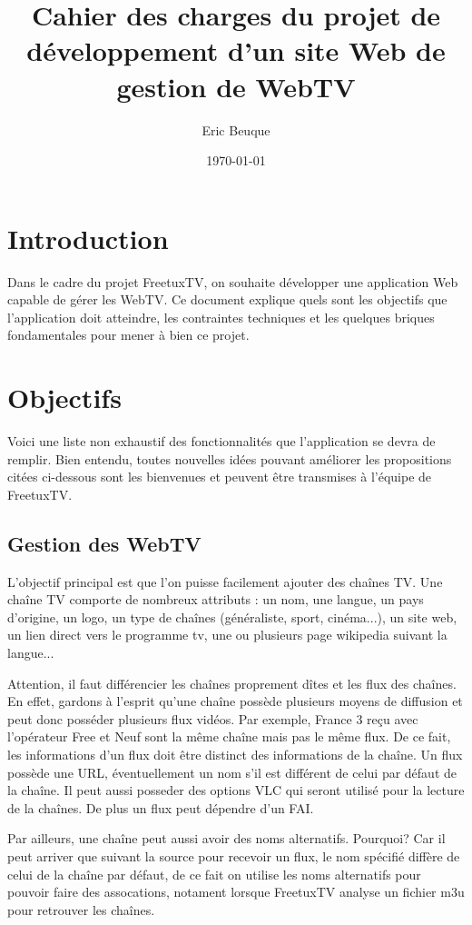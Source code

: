 \documentclass[10pt,a4paper]{article}
\author{Eric Beuque}
\title{Cahier des charges du projet de développement d'un site Web de gestion de WebTV}
\date{\today}
\begin{document}
\maketitle

\section*{Introduction}

Dans le cadre du projet FreetuxTV, on souhaite développer une application Web capable de gérer les WebTV. Ce document explique quels sont les objectifs que l'application doit atteindre, les contraintes techniques et les quelques briques fondamentales pour mener à bien ce projet.

\section{Objectifs}

Voici une liste non exhaustif des fonctionnalités que l'application se devra de remplir. Bien entendu, toutes nouvelles idées pouvant améliorer les propositions citées ci-dessous sont les bienvenues et peuvent être transmises à l'équipe de FreetuxTV.

\subsection{Gestion des WebTV}

L'objectif principal est que l'on puisse facilement ajouter des chaînes TV. Une chaîne TV comporte de nombreux attributs : un nom, une langue, un pays d'origine, un logo, un type de chaînes (généraliste, sport, cinéma...), un site web, un lien direct vers le programme tv, une ou plusieurs page wikipedia suivant la langue...

Attention, il faut différencier les chaînes proprement dîtes et les flux des chaînes. En effet, gardons à l'esprit qu'une chaîne possède plusieurs moyens de diffusion et peut donc posséder plusieurs flux vidéos. Par exemple, France 3 reçu avec l'opérateur Free et Neuf sont la même chaîne mais pas le même flux. De ce fait, les informations d'un flux doit être distinct des informations de la chaîne. Un flux possède une URL, éventuellement un nom s'il est différent de celui par défaut de la chaîne. Il peut aussi posseder des options VLC qui seront utilisé pour la lecture de la chaînes. De plus un flux peut dépendre d'un FAI.

Par ailleurs, une chaîne peut aussi avoir des noms alternatifs. Pourquoi? Car il peut arriver que suivant la source pour recevoir un flux, le nom spécifié diffère de celui de la chaîne par défaut, de ce fait on utilise les noms alternatifs pour pouvoir faire des assocations, notament lorsque FreetuxTV analyse un fichier m3u pour retrouver les chaînes.
\end{document}
